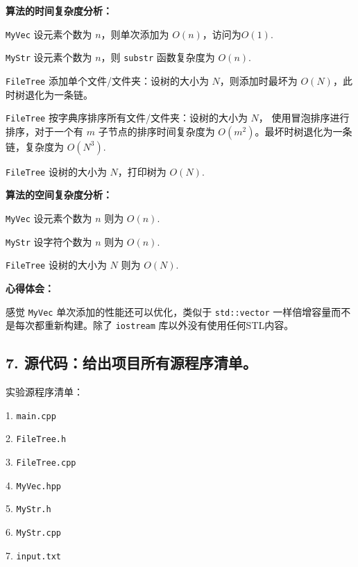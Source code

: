 \documentclass[a4paper]{ctexart}
\begin{document}
\noindent \textbf{算法的时间复杂度分析：}

\texttt{MyVec} 设元素个数为 $n$，则单次添加为 $O(n)$，访问为$O(1)$.

\texttt{MyStr} 设元素个数为 $n$，则 \texttt{substr} 函数复杂度为 $O(n)$.

\texttt{FileTree} 添加单个文件/文件夹：设树的大小为 $N$，则添加时最坏为 $O(N)$，此时树退化为一条链。

\texttt{FileTree} 按字典序排序所有文件/文件夹：设树的大小为 $N$， 使用冒泡排序进行排序，对于一个有 $m$ 子节点的排序时间复杂度为 $O(m^2)$。最坏时树退化为一条链，复杂度为 $O(N^3)$.

\texttt{FileTree} 设树的大小为 $N$，打印树为 $O(N)$.

\noindent \textbf{算法的空间复杂度分析：} 

\texttt{MyVec} 设元素个数为 $n$ 则为 $O(n)$.

\texttt{MyStr} 设字符个数为 $n$ 则为 $O(n)$.

\texttt{FileTree} 设树的大小为 $N$ 则为 $O(N)$.

\noindent \textbf{心得体会：}

感觉 \texttt{MyVec} 单次添加的性能还可以优化，类似于 \texttt{std::vector} 一样倍增容量而不是每次都重新构建。除了 \texttt{iostream} 库以外没有使用任何STL内容。

\subsection*{7. 源代码：给出项目所有源程序清单。\\ }

实验源程序清单：

\hspace*{2em} 1. \texttt{main.cpp}

\hspace*{2em} 2. \texttt{FileTree.h}

\hspace*{2em} 3. \texttt{FileTree.cpp}

\hspace*{2em} 4. \texttt{MyVec.hpp}

\hspace*{2em} 5. \texttt{MyStr.h}

\hspace*{2em} 6. \texttt{MyStr.cpp}

\hspace*{2em} 7. \texttt{input.txt}
\end{document}
